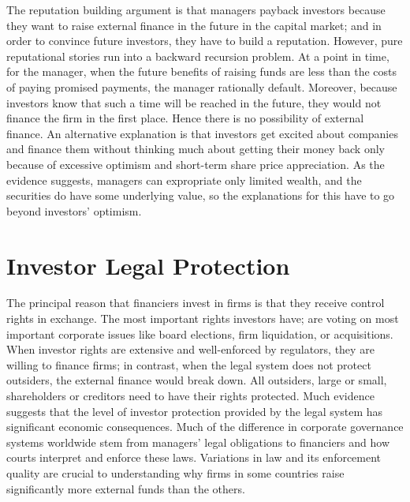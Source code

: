 \documentclass[final,1p,authoryear]{elsarticle}
\begin{document}
The reputation building argument is that managers payback investors because they want to raise external finance in the future in the capital market; and in order to convince future investors, they have to build a reputation. However, pure reputational stories run into a backward recursion problem. At a point in time, for the manager, when the future benefits of raising funds are less than the costs of paying promised payments, the manager rationally default. Moreover, because investors know that such a time will be reached in the future, they would not finance the firm in the first place. Hence there is no possibility of external finance. An alternative explanation is that investors get excited about companies and finance them without thinking much about getting their money back only because of excessive optimism and short-term share price appreciation. As the evidence suggests, managers can expropriate only limited wealth, and the securities do have some underlying value, so the explanations for this have to go beyond investors' optimism.


\section{Investor Legal Protection}

The principal reason that financiers invest in firms is that they receive control rights in exchange. The most important rights investors have; are voting on most important corporate issues like board elections, firm liquidation, or acquisitions. When investor rights are extensive and well-enforced by regulators, they are willing to finance firms; in contrast, when the legal system does not protect outsiders, the external finance would break down. All outsiders, large or small, shareholders or creditors need to have their rights protected. Much evidence suggests that the level of investor protection provided by the legal system has significant economic consequences. Much of the difference in corporate governance systems worldwide stem from managers' legal obligations to financiers and how courts interpret and enforce these laws. Variations in law and its enforcement quality are crucial to understanding why firms in some countries raise significantly more external funds than the others.
\end{document}
